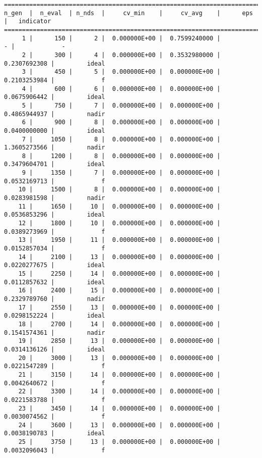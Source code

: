 \documentclass[
  authoryear,
  preprint,
  3p]{elsarticle}
\begin{document}
\begin{verbatim}
==========================================================================================
n_gen  |  n_eval  | n_nds  |     cv_min    |     cv_avg    |      eps      |   indicator  
==========================================================================================
     1 |      150 |      2 |  0.000000E+00 |  0.7599240000 |             - |             -
     2 |      300 |      4 |  0.000000E+00 |  0.3532980000 |  0.2307692308 |         ideal
     3 |      450 |      5 |  0.000000E+00 |  0.000000E+00 |  0.2103253984 |             f
     4 |      600 |      6 |  0.000000E+00 |  0.000000E+00 |  0.0675906442 |         ideal
     5 |      750 |      7 |  0.000000E+00 |  0.000000E+00 |  0.4865944937 |         nadir
     6 |      900 |      8 |  0.000000E+00 |  0.000000E+00 |  0.0400000000 |         ideal
     7 |     1050 |      8 |  0.000000E+00 |  0.000000E+00 |  1.3605273566 |         nadir
     8 |     1200 |      8 |  0.000000E+00 |  0.000000E+00 |  0.3479604701 |         ideal
     9 |     1350 |      7 |  0.000000E+00 |  0.000000E+00 |  0.0532169713 |             f
    10 |     1500 |      8 |  0.000000E+00 |  0.000000E+00 |  0.0283981598 |         nadir
    11 |     1650 |     10 |  0.000000E+00 |  0.000000E+00 |  0.0536853296 |         ideal
    12 |     1800 |     10 |  0.000000E+00 |  0.000000E+00 |  0.0389273969 |             f
    13 |     1950 |     11 |  0.000000E+00 |  0.000000E+00 |  0.0152857034 |             f
    14 |     2100 |     13 |  0.000000E+00 |  0.000000E+00 |  0.0220277675 |         ideal
    15 |     2250 |     14 |  0.000000E+00 |  0.000000E+00 |  0.0112857632 |         ideal
    16 |     2400 |     15 |  0.000000E+00 |  0.000000E+00 |  0.2329789760 |         nadir
    17 |     2550 |     13 |  0.000000E+00 |  0.000000E+00 |  0.0298152224 |         ideal
    18 |     2700 |     14 |  0.000000E+00 |  0.000000E+00 |  0.1541574361 |         nadir
    19 |     2850 |     13 |  0.000000E+00 |  0.000000E+00 |  0.0314136126 |         ideal
    20 |     3000 |     13 |  0.000000E+00 |  0.000000E+00 |  0.0221547289 |             f
    21 |     3150 |     14 |  0.000000E+00 |  0.000000E+00 |  0.0042640672 |             f
    22 |     3300 |     14 |  0.000000E+00 |  0.000000E+00 |  0.0221583788 |             f
    23 |     3450 |     14 |  0.000000E+00 |  0.000000E+00 |  0.0030074562 |             f
    24 |     3600 |     13 |  0.000000E+00 |  0.000000E+00 |  0.0038190783 |         ideal
    25 |     3750 |     13 |  0.000000E+00 |  0.000000E+00 |  0.0032096043 |             f

\end{verbatim}
\end{document}
